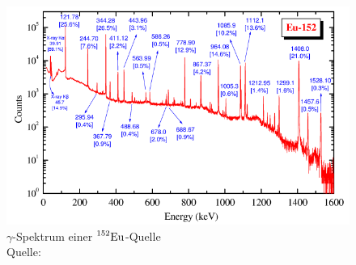 	\begin{figure}[htb]
		\centering
		\includegraphics[scale=0.5]{ref/Eu152.png}
		\caption{$\gamma$-Spektrum einer $\prescript{152}{}{\mathrm{Eu}}$-Quelle \\ Quelle: }
		\label{fig:ref-eu-152}
	\end{figure}

